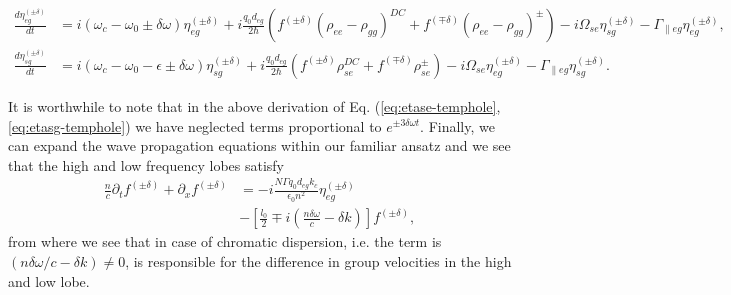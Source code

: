 \documentclass[twocolumn,secnumarabic,amssymb, nobibnotes, aps, prd]{revtex4-1}
\begin{document}
\begin{widetext}
\begin{align}
	\frac{d \eta_{eg}^{(\pm\delta)}}{d t} &= i(\omega_c-\omega_0\pm \delta\omega)\eta_{eg}^{(\pm\delta)}
	+i\frac{q_0d_{eg}}{2\hbar} ( f^{(\pm\delta)}(\rho_{ee}-\rho_{gg})^{DC} + f^{(\mp \delta)} (\rho_{ee}-\rho_{gg})^{\pm})-i\Omega_{se}\eta_{sg}^{(\pm\delta)}- \Gamma_{\parallel eg}\eta_{eg}^{(\pm\delta)}, \label{eq:etase-temphole} \\
	\frac{d \eta_{sg}^{(\pm\delta)}}{d t} &= i(\omega_c-\omega_0-\epsilon \pm \delta\omega)\eta_{sg}^{(\pm\delta)}+i\frac{q_0d_{eg}}{2\hbar} ( f^{(\pm\delta)}\rho_{se}^{DC} + f^{(\mp \delta)} \rho_{se}^{\pm})-i\Omega_{se}\eta_{eg}^{(\pm\delta)}- \Gamma_{\parallel eg}\eta_{sg}^{(\pm\delta)}. \label{eq:etasg-temphole}
	\end{align} 
\end{widetext}

It is worthwhile to note that in the above derivation of Eq. (\ref{eq:etase-temphole},\ref{eq:etasg-temphole}) we have neglected terms proportional to $e^{\pm 3\delta \omega t}$. Finally, we can expand the wave propagation equations within our familiar ansatz and we see that the high and low frequency lobes satisfy
\begin{align}
\frac{n}{c}\partial_t f^{(\pm \delta)} + \partial_{x}f^{(\pm \delta)}&= -i\frac{N \Gamma q_0d_{eg} k_c}{\epsilon_0 n^2} \eta_{eg}^{(\pm \delta)} \nonumber \\ 
&- \left[\frac{l_0}{2}  \mp i (\frac{n\delta\omega}{c}-\delta k)\right] f^{(\pm \delta)}\label{eq:rtwave-temphole},
\end{align}
from where we see that in case of chromatic dispersion, i.e. the term is $(n\delta\omega/c-\delta k) \neq 0 $, is responsible for the difference in group velocities in the high and low lobe.
\end{document}
